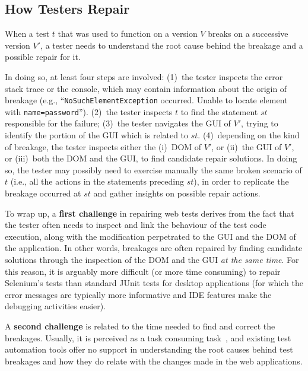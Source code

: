
\subsection{How Testers Repair}

When a test $t$ that was used to function on a version $V$  breaks on a successive version $V'$, a tester needs to understand the root cause behind the breakage and a possible repair for it. 

In doing so, at least four steps are involved: 
(1)~the tester inspects the error stack trace or the console, which may contain information about the origin of breakage (e.g., ``\texttt{NoSuchElementException} occurred. Unable to locate element with \mbox{\texttt{name=password}}''). 
(2)~the tester inspects $t$ to find the statement $st$ responsible for the failure; %
(3)~the tester navigates the GUI of $V'$, trying to identify the portion of the GUI which is related to $st$. 
(4)~depending on the kind of breakage, the tester inspects either the (i)~DOM of $V'$, or (ii)~the GUI of $V'$, or (iii)~both the DOM and the GUI, to find candidate repair solutions. In doing so, the tester may possibly need to exercise manually the same broken scenario of $t$ (i.e., all the actions in the statements preceding $st$), in order to replicate the breakage occurred at $st$ and gather insights on possible repair actions.

To wrap up, a \textbf{first challenge} in repairing web tests derives from the fact that  
the tester often needs to inspect and link the behaviour of the test code execution, along with the modification perpetrated to the GUI and the DOM of the application. 
In other words, breakages are often repaired by finding candidate solutions through the inspection of the DOM and the GUI \textit{at the same time}.
For this reason, it is arguably more difficult (or more time consuming) to repair Selenium's tests than standard JUnit tests for desktop applications (for which the error messages are typically more informative and IDE features make the debugging activities easier).

A \textbf{second challenge} is related to the time needed to find and correct the breakages. Usually, it is perceived as a task consuming task~\cite{Leotta-TAIC-2013,JAMAICA2013}, and existing test automation tools offer no support in understanding the root causes behind test breakages and how they do relate with the changes made in the web applications. 

